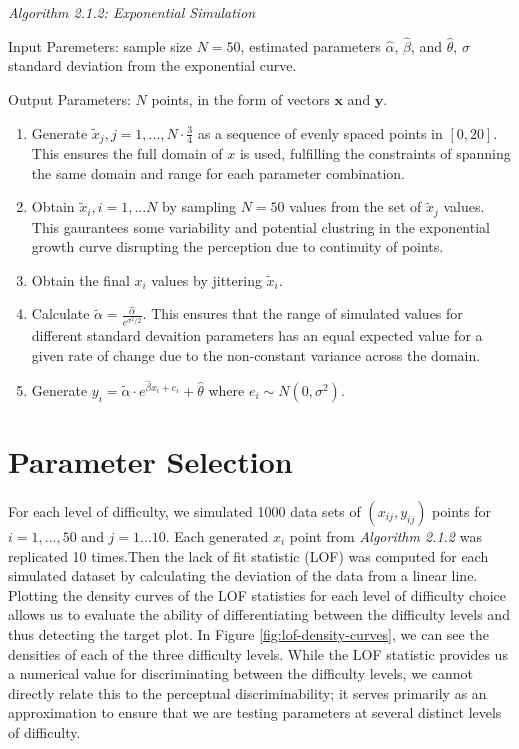 \documentclass[]{interact}
\theoremstyle{plain}%
\theoremstyle{definition}
\theoremstyle{remark}
\begin{document}
\noindent\textit{Algorithm 2.1.2: Exponential Simulation}

Input Paremeters: sample size \(N = 50\), estimated parameters
\(\hat\alpha\), \(\hat\beta\), and \(\hat\theta\), \(\sigma\) standard
\indent deviation from the exponential curve.

Output Parameters: \(N\) points, in the form of vectors \(\mathbf{x}\)
and \(\mathbf{y}\).

\begin{enumerate}
\def\labelenumi{\arabic{enumi}.}
\item
  Generate \(\tilde x_j, j = 1,..., N\cdot \frac{3}{4}\) as a sequence
  of evenly spaced points in \([0,20]\). This ensures the full domain of
  \(x\) is used, fulfilling the constraints of spanning the same domain
  and range for each parameter combination.
\item
  Obtain \(\tilde x_i, i = 1,...N\) by sampling \(N = 50\) values from
  the set of \(\tilde x_j\) values. This gaurantees some variability and
  potential clustring in the exponential growth curve disrupting the
  perception due to continuity of points.
\item
  Obtain the final \(x_i\) values by jittering \(\tilde x_i\).
\item
  Calculate \(\tilde\alpha = \frac{\hat\alpha}{e^{\sigma^2/2}}.\) This
  ensures that the range of simulated values for different standard
  devaition parameters has an equal expected value for a given rate of
  change due to the non-constant variance across the domain.
\item
  Generate
  \(y_i = \tilde\alpha\cdot e^{\hat\beta x_i + e_i}+\hat\theta\) where
  \(e_i\sim N(0,\sigma^2).\)
\end{enumerate}

\hypertarget{parameter-selection}{%
\section{\texorpdfstring{Parameter Selection
\label{app:parameters}}{Parameter Selection }}\label{parameter-selection}}

For each level of difficulty, we simulated 1000 data sets of
\((x_{ij}, y_{ij})\) points for \(i = 1,...,50\) and \(j = 1...10\).
Each generated \(x_i\) point from \textit{Algorithm 2.1.2} was
replicated 10 times.Then the lack of fit statistic (LOF) was computed
for each simulated dataset by calculating the deviation of the data from
a linear line. Plotting the density curves of the LOF statistics for
each level of difficulty choice allows us to evaluate the ability of
differentiating between the difficulty levels and thus detecting the
target plot. In Figure \ref{fig:lof-density-curves}, we can see the
densities of each of the three difficulty levels. While the LOF
statistic provides us a numerical value for discriminating between the
difficulty levels, we cannot directly relate this to the perceptual
discriminability; it serves primarily as an approximation to ensure that
we are testing parameters at several distinct levels of difficulty.
\end{document}
